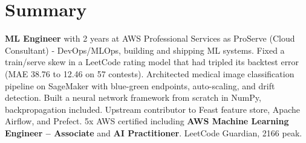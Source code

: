 \section{\textbf{Summary}}
\vspace{1pt}
\small{\textbf{ML Engineer} with 2 years at AWS Professional Services as ProServe (Cloud Consultant) - DevOps/MLOps, building and shipping ML systems. Fixed a train/serve skew in a LeetCode rating model that had tripled its backtest error (MAE 38.76 to 12.46 on 57 contests). Architected medical image classification pipeline on SageMaker with blue-green endpoints, auto-scaling, and drift detection. Built a neural network framework from scratch in NumPy, backpropagation included. Upstream contributor to Feast feature store, Apache Airflow, and Prefect. 5x AWS certified including \textbf{AWS Machine Learning Engineer -- Associate} and \textbf{AI Practitioner}. LeetCode Guardian, 2166 peak.}
\vspace{-2mm}
